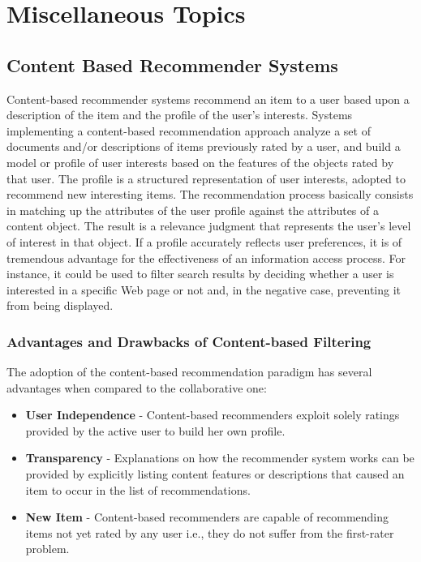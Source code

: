   \section{Miscellaneous Topics}
  \subsection{Content Based Recommender Systems}

 Content-based recommender systems recommend an item to a user based upon a description of the item and the profile of the user’s interests. Systems implementing a content-based recommendation approach analyze a set of documents and/or descriptions of items previously rated by a user, and build a model or profile of user interests based on the features of the objects rated by that user. The profile is a structured representation of user interests, adopted to recommend new interesting items. The recommendation process basically consists in matching up the attributes of the user profile against the attributes of a content object. The result is a relevance judgment that represents the user’s level of interest in that object. If a profile accurately reflects user preferences, it is of tremendous advantage for the effectiveness of an information access process. For instance, it could be used to filter search results by deciding whether a user is interested in a specific Web page or not and, in the negative case, preventing it from being displayed.
\subsubsection{Advantages and Drawbacks of Content-based Filtering}

 The adoption of the content-based recommendation paradigm has several advantages when compared to the collaborative one:
\begin{itemize}
\item \textbf{User Independence} - Content-based recommenders exploit solely ratings provided by the active user to build her own profile.
\end{itemize}
\begin{itemize}
\item \textbf{Transparency} - Explanations on how the recommender system works can be provided by explicitly listing content features or descriptions that caused an item to occur in the list of recommendations. 
\end{itemize}
\begin{itemize}
\item \textbf{New Item} - Content-based recommenders are capable of recommending items not yet rated by any user i.e., they do not suffer from the first-rater problem.
\end{itemize}

